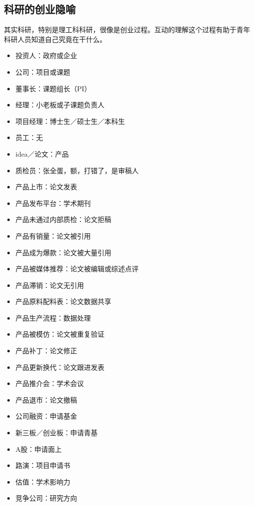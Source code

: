 \documentclass[]{tufte-book}
\begin{document}
\hypertarget{ux79d1ux7814ux7684ux521bux4e1aux9690ux55bb}{%
\subsection{科研的创业隐喻}\label{ux79d1ux7814ux7684ux521bux4e1aux9690ux55bb}}

其实科研，特别是理工科科研，很像是创业过程。互动的理解这个过程有助于青年科研人员知道自己究竟在干什么。

\begin{itemize}
\item
  投资人：政府或企业
\item
  公司：项目或课题
\item
  董事长：课题组长（PI）
\item
  经理：小老板或子课题负责人
\item
  项目经理：博士生／硕士生／本科生
\item
  员工：无
\item
  idea／论文：产品
\item
  质检员：张全蛋，额，打错了，是审稿人
\item
  产品上市：论文发表
\item
  产品发布平台：学术期刊
\item
  产品未通过内部质检：论文拒稿
\item
  产品有销量：论文被引用
\item
  产品成为爆款：论文被大量引用
\item
  产品被媒体推荐：论文被编辑或综述点评
\item
  产品滞销：论文无引用
\item
  产品原料配料表：论文数据共享
\item
  产品生产流程：数据处理
\item
  产品被模仿：论文被重复验证
\item
  产品补丁：论文修正
\item
  产品更新换代：论文跟进发表
\item
  产品推介会：学术会议
\item
  产品退市：论文撤稿
\item
  公司融资：申请基金
\item
  新三板／创业板：申请青基
\item
  A股：申请面上
\item
  路演：项目申请书
\item
  估值：学术影响力
\item
  竞争公司：研究方向
\end{itemize}
\end{document}
